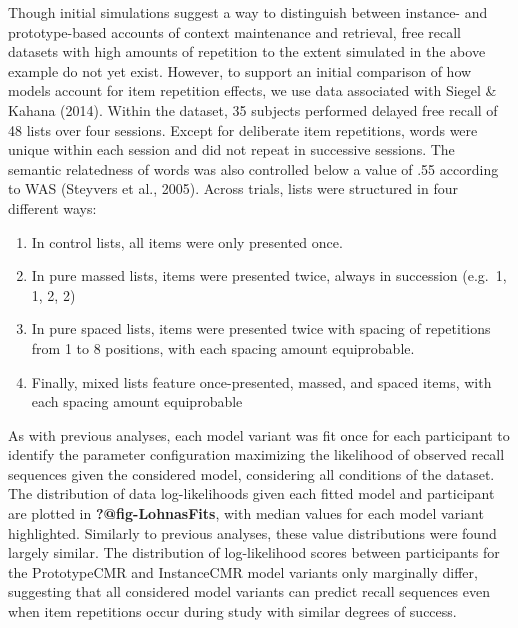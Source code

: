 \documentclass[
  letterpaper,
  DIV=11,
  numbers=noendperiod]{scrreport}
\begin{document}
Though initial simulations suggest a way to distinguish between
instance- and prototype-based accounts of context maintenance and
retrieval, free recall datasets with high amounts of repetition to the
extent simulated in the above example do not yet exist. However, to
support an initial comparison of how models account for item repetition
effects, we use data associated with Siegel \& Kahana (2014). Within the
dataset, 35 subjects performed delayed free recall of 48 lists over four
sessions. Except for deliberate item repetitions, words were unique
within each session and did not repeat in successive sessions. The
semantic relatedness of words was also controlled below a value of .55
according to WAS (Steyvers et al., 2005). Across trials, lists were
structured in four different ways:

\begin{enumerate}
\def\labelenumi{\arabic{enumi}.}
\item
  In control lists, all items were only presented once.
\item
  In pure massed lists, items were presented twice, always in succession
  (e.g.~1, 1, 2, 2)
\item
  In pure spaced lists, items were presented twice with spacing of
  repetitions from 1 to 8 positions, with each spacing amount
  equiprobable.
\item
  Finally, mixed lists feature once-presented, massed, and spaced items,
  with each spacing amount equiprobable
\end{enumerate}

As with previous analyses, each model variant was fit once for each
participant to identify the parameter configuration maximizing the
likelihood of observed recall sequences given the considered model,
considering all conditions of the dataset. The distribution of data
log-likelihoods given each fitted model and participant are plotted in
\textbf{?@fig-LohnasFits}, with median values for each model variant
highlighted. Similarly to previous analyses, these value distributions
were found largely similar. The distribution of log-likelihood scores
between participants for the PrototypeCMR and InstanceCMR model variants
only marginally differ, suggesting that all considered model variants
can predict recall sequences even when item repetitions occur during
study with similar degrees of success.
\end{document}
